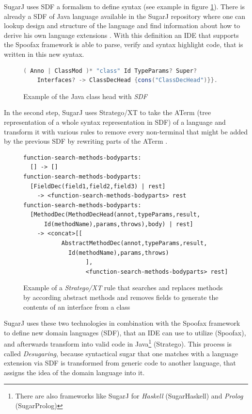 \documentclass{report}
\begin{document}
SugarJ uses SDF a formalism to define syntax (see example in figure \ref{exampleSDFJavaClassDecHead}). There is already a SDF of Java language available in the SugarJ repository where one can lookup design and structure of the language and find information about how to derive his own language extensions \cite{Heering-SDF-1989, Brand-SDF-2007, Java-SDF-2014}. With this definition an IDE that supports the Spoofax framework is able to parse, verify and syntax highlight code, that is written in this new syntax.

\begin{figure}[H]
\begin{lstlisting}[language=java,breaklines=false]
( Anno | ClassMod )* "class" Id TypeParams? Super? 
    Interfaces? -> ClassDecHead {cons("ClassDecHead")}}.
\end{lstlisting}
\caption{Example of the Java class head with \emph{SDF}}
\label{exampleSDFJavaClassDecHead}
\end{figure}

In the second step, SugarJ uses Stratego/XT to take the ATerm (tree representation of a whole syntax representation in SDF) of a language and transform it with various rules to remove every non-terminal that might be added by the previous SDF by rewriting parts of the ATerm \cite{Stratego-Manual, Kats-Spoofax-2010, Brand-ATerms-2000, Visser-Stratego-2003}.

\begin{figure}[H]
\begin{lstlisting}[breaklines=false,morekeywords={field1,field2,field3,annot,typeParams,result,methodName,params,throws,body,rest},keywordstyle=\bfseries\color{OliveGreen}]
function-search-methods-bodyparts:
  [] -> []
function-search-methods-bodyparts:
  [FieldDec(field1,field2,field3) | rest]
    -> <function-search-methods-bodyparts> rest
function-search-methods-bodyparts:
  [MethodDec(MethodDecHead(annot,typeParams,result,
      Id(methodName),params,throws),body) | rest]
    -> <concat>[[
		   AbstractMethodDec(annot,typeParams,result,
		     Id(methodName),params,throws)
		          ],
		          <function-search-methods-bodyparts> rest]
\end{lstlisting}
\caption{Example of a \emph{Stratego/XT} rule that searches and replaces methods by according abstract methods and removes fields to generate the contents of an interface from a class}
\label{exampleStrategoClassInterfaceTranslation}
\end{figure}


SugarJ uses these two technologies in combination with the Spoofax framework to define new domain languages (SDF), that an IDE can use to utilize (Spoofax), and afterwards transform into valid code in Java\footnote{There are also frameworks like SugarJ for \emph{Haskell} (SugarHaskell) and \emph{Prolog} (SugarProlog)} (Stratego). This process is called \emph{Desugaring}, because syntactical sugar that one matches with a language extension via SDF is transformed from generic code to another language, that assigns the idea of the domain language into it.
\end{document}
